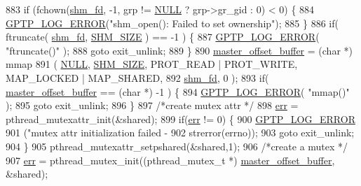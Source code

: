\begin{DoxyCode}
{{883     \textcolor{keywordflow}{if} (fchown(\hyperlink{class_linux_shared_memory_i_p_c_a67ca3e78936424920539c340223a0b0a}{shm\_fd}, -1, grp != \hyperlink{openavb__types__base__pub_8h_a070d2ce7b6bb7e5c05602aa8c308d0c4}{NULL} ? grp->gr\_gid : 0) < 0) \{
884         \hyperlink{gptp__log_8hpp_afefbb1009717c128012bfeed94842987}{GPTP\_LOG\_ERROR}(\textcolor{stringliteral}{"shm\_open(): Failed to set ownership"});
885     \}
886     \textcolor{keywordflow}{if}( ftruncate( \hyperlink{class_linux_shared_memory_i_p_c_a67ca3e78936424920539c340223a0b0a}{shm\_fd}, \hyperlink{linux__ipc_8hpp_a16e67aa18d42bbdb08ac9af1c8d0f4f9}{SHM\_SIZE} ) == -1 ) \{
887         \hyperlink{gptp__log_8hpp_afefbb1009717c128012bfeed94842987}{GPTP\_LOG\_ERROR}( \textcolor{stringliteral}{"ftruncate()"} );
888         \textcolor{keywordflow}{goto} exit\_unlink;
889     \}
890     \hyperlink{class_linux_shared_memory_i_p_c_a028459163bd8b988344f6837036cb0be}{master\_offset\_buffer} = (\textcolor{keywordtype}{char} *) mmap
891         ( \hyperlink{openavb__types__base__pub_8h_a070d2ce7b6bb7e5c05602aa8c308d0c4}{NULL}, \hyperlink{linux__ipc_8hpp_a16e67aa18d42bbdb08ac9af1c8d0f4f9}{SHM\_SIZE}, PROT\_READ | PROT\_WRITE, MAP\_LOCKED | MAP\_SHARED,
892           \hyperlink{class_linux_shared_memory_i_p_c_a67ca3e78936424920539c340223a0b0a}{shm\_fd}, 0 );
893     \textcolor{keywordflow}{if}( \hyperlink{class_linux_shared_memory_i_p_c_a028459163bd8b988344f6837036cb0be}{master\_offset\_buffer} == (\textcolor{keywordtype}{char} *) -1 ) \{
894         \hyperlink{gptp__log_8hpp_afefbb1009717c128012bfeed94842987}{GPTP\_LOG\_ERROR}( \textcolor{stringliteral}{"mmap()"} );
895         \textcolor{keywordflow}{goto} exit\_unlink;
896     \}
897     \textcolor{comment}{/*create mutex attr */}
898     \hyperlink{class_linux_shared_memory_i_p_c_a6ce68847c12434f60d1b2654a3dc3409}{err} = pthread\_mutexattr\_init(&shared);
899     \textcolor{keywordflow}{if}(\hyperlink{class_linux_shared_memory_i_p_c_a6ce68847c12434f60d1b2654a3dc3409}{err} != 0) \{
900         \hyperlink{gptp__log_8hpp_afefbb1009717c128012bfeed94842987}{GPTP\_LOG\_ERROR}
901             (\textcolor{stringliteral}{"mutex attr initialization failed - %
902              strerror(errno));
903         \textcolor{keywordflow}{goto} exit\_unlink;
904     \}
905     pthread\_mutexattr\_setpshared(&shared,1);
906     \textcolor{comment}{/*create a mutex */}
907     \hyperlink{class_linux_shared_memory_i_p_c_a6ce68847c12434f60d1b2654a3dc3409}{err} = pthread\_mutex\_init((pthread\_mutex\_t *) \hyperlink{class_linux_shared_memory_i_p_c_a028459163bd8b988344f6837036cb0be}{master\_offset\_buffer}, &shared);
}}}
\end{DoxyCode}
